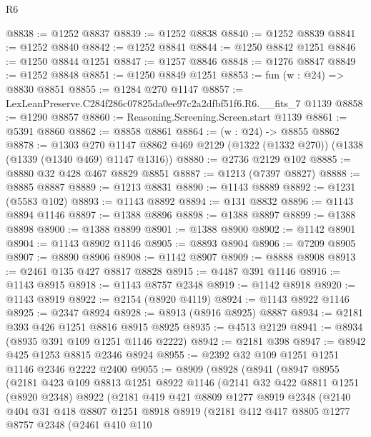 \begin{lexlean}{R6}
\begin{coremodule}
@8838 := @1252 @8837
@8839 := @1252 @8838
@8840 := @1252 @8839
@8841 := @1252 @8840
@8842 := @1252 @8841
@8844 := @1250 @8842 @1251
@8846 := @1250 @8844 @1251
@8847 := @1257 @8846
@8848 := @1276 @8847
@8849 := @1252 @8848
@8851 := @1250 @8849 @1251
@8853 := fun (w : @24) => @8830 @8851
@8855 := @1284 @270 @1147
@8857 := LexLeanPreserve.C284f286c07825da0ee97c2a2dfbf51f6.R6.__fits_7 @1139
@8858 := @1290 @8857
@8860 := Reasoning.Screening.Screen.start @1139
@8861 := @5391 @8860
@8862 := @8858 @8861
@8864 := (w : @24) -> @8855 @8862
@8878 := @1303
    @270
    @1147
    @8862
    @469
    @2129
    (@1322 (@1332 @270))
    (@1338 (@1339 (@1340 @469) @1147 @1316))
@8880 := @2736 @2129 @102
@8885 := @8880 @32 @428 @467 @8829 @8851
@8887 := @1213 (@7397 @8827)
@8888 := @8885 @8887
@8889 := @1213 @8831
@8890 := @1143 @8889
@8892 := @1231 (@5583 @102)
@8893 := @1143 @8892
@8894 := @131 @8832
@8896 := @1143 @8894 @1146
@8897 := @1388 @8896
@8898 := @1388 @8897
@8899 := @1388 @8898
@8900 := @1388 @8899
@8901 := @1388 @8900
@8902 := @1142 @8901
@8904 := @1143 @8902 @1146
@8905 := @8893 @8904
@8906 := @7209 @8905
@8907 := @8890 @8906
@8908 := @1142 @8907
@8909 := @8888 @8908
@8913 := @2461 @135 @427 @8817 @8828
@8915 := @4487 @391 @1146
@8916 := @1143 @8915
@8918 := @1143 @8757 @2348
@8919 := @1142 @8918
@8920 := @1143 @8919
@8922 := @2154 (@8920 @4119)
@8924 := @1143 @8922 @1146
@8925 := @2347 @8924
@8928 := @8913 (@8916 @8925) @8887
@8934 := @2181 @393 @426 @1251 @8816 @8915 @8925
@8935 := @4513 @2129
@8941 := @8934 (@8935 @391 @109 @1251 @1146 @2222)
@8942 := @2181 @398
@8947 := @8942 @425 @1253 @8815 @2346 @8924
@8955 := @2392 @32 @109 @1251 @1251 @1146 @2346 @2222 @2400
@9055 := @8909
    (@8928
      (@8941
        (@8947
          @8955
          (@2181
            @423
            @109
            @8813
            @1251
            @8922
            @1146
            (@2141
              @32
              @422
              @8811
              @1251
              (@8920 @2348)
              @8922
              (@2181
                @419
                @421
                @8809
                @1277
                @8919
                @2348
                (@2140
                  @404
                  @31
                  @418
                  @8807
                  @1251
                  @8918
                  @8919
                  (@2181
                    @412
                    @417
                    @8805
                    @1277
                    @8757
                    @2348
                    (@2461
                      @410
                      @110

\end{coremodule}
\end{lexlean}
